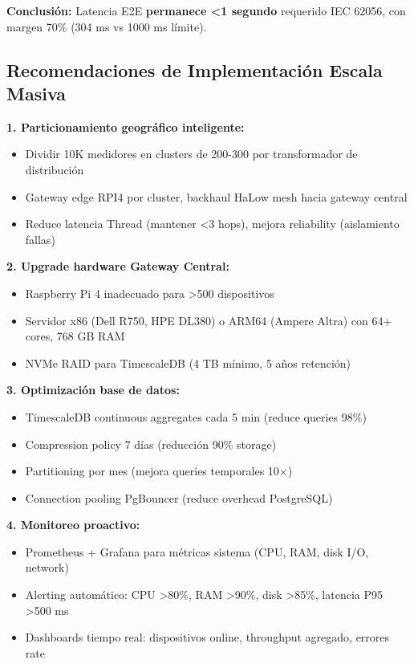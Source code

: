 \textbf{Conclusión:} Latencia E2E \textbf{permanece <1 segundo} requerido IEC 62056, con margen 70\% (304 ms vs 1000 ms límite).

\subsection{Recomendaciones de Implementación Escala Masiva}

\textbf{1. Particionamiento geográfico inteligente:}
\begin{itemize}
\item Dividir 10K medidores en clusters de 200-300 por transformador de distribución
\item Gateway edge RPI4 por cluster, backhaul HaLow mesh hacia gateway central
\item Reduce latencia Thread (mantener <3 hops), mejora reliability (aislamiento fallas)
\end{itemize}

\textbf{2. Upgrade hardware Gateway Central:}
\begin{itemize}
\item Raspberry Pi 4 inadecuado para >500 dispositivos
\item Servidor x86 (Dell R750, HPE DL380) o ARM64 (Ampere Altra) con 64+ cores, 768 GB RAM
\item NVMe RAID para TimescaleDB (4 TB mínimo, 5 años retención)
\end{itemize}

\textbf{3. Optimización base de datos:}
\begin{itemize}
\item TimescaleDB continuous aggregates cada 5 min (reduce queries 98\%)
\item Compression policy 7 días (reducción 90\% storage)
\item Partitioning por mes (mejora queries temporales 10$\times$)
\item Connection pooling PgBouncer (reduce overhead PostgreSQL)
\end{itemize}

\textbf{4. Monitoreo proactivo:}
\begin{itemize}
\item Prometheus + Grafana para métricas sistema (CPU, RAM, disk I/O, network)
\item Alerting automático: CPU >80\%, RAM >90\%, disk >85\%, latencia P95 >500 ms
\item Dashboards tiempo real: dispositivos online, throughput agregado, errores rate
\end{itemize}

